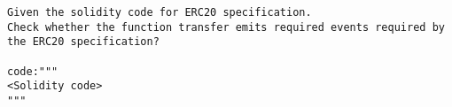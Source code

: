 
\begin{lstlisting}[label={lst:exp-inst-st2},captionpos=b, caption={Example of prompt in instruction experiment setting-2},language=GPTPrompt]
Given the solidity code for ERC20 specification.
Check whether the function transfer emits required events required by the ERC20 specification?

code:"""
<Solidity code>
"""
\end{lstlisting}